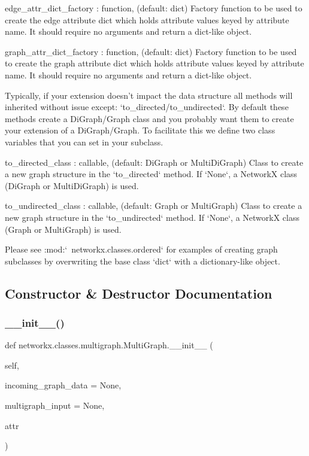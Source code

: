 \begin{DoxyVerb}
edge_attr_dict_factory : function, (default: dict)
    Factory function to be used to create the edge attribute
    dict which holds attribute values keyed by attribute name.
    It should require no arguments and return a dict-like object.

graph_attr_dict_factory : function, (default: dict)
    Factory function to be used to create the graph attribute
    dict which holds attribute values keyed by attribute name.
    It should require no arguments and return a dict-like object.

Typically, if your extension doesn't impact the data structure all
methods will inherited without issue except: `to_directed/to_undirected`.
By default these methods create a DiGraph/Graph class and you probably
want them to create your extension of a DiGraph/Graph. To facilitate
this we define two class variables that you can set in your subclass.

to_directed_class : callable, (default: DiGraph or MultiDiGraph)
    Class to create a new graph structure in the `to_directed` method.
    If `None`, a NetworkX class (DiGraph or MultiDiGraph) is used.

to_undirected_class : callable, (default: Graph or MultiGraph)
    Class to create a new graph structure in the `to_undirected` method.
    If `None`, a NetworkX class (Graph or MultiGraph) is used.

Please see :mod:`~networkx.classes.ordered` for examples of
creating graph subclasses by overwriting the base class `dict` with
a dictionary-like object.
\end{DoxyVerb}
 

\subsection{Constructor \& Destructor Documentation}
\mbox{\label{classnetworkx_1_1classes_1_1multigraph_1_1MultiGraph_a4207e5a486c0644d6126bfea182136d1}} 
\subsubsection{\texorpdfstring{\+\_\+\+\_\+init\+\_\+\+\_\+()}{\_\_init\_\_()}}
{\footnotesize\ttfamily def networkx.\+classes.\+multigraph.\+Multi\+Graph.\+\_\+\+\_\+init\+\_\+\+\_\+ (\begin{DoxyParamCaption}\item[{}]{self,  }\item[{}]{incoming\+\_\+graph\+\_\+data = {\ttfamily None},  }\item[{}]{multigraph\+\_\+input = {\ttfamily None},  }\item[{}]{attr }\end{DoxyParamCaption})}

